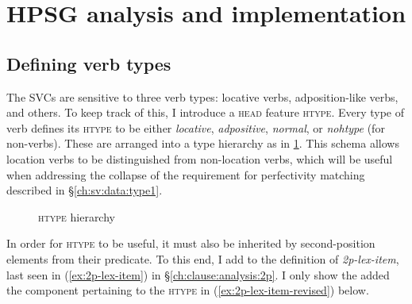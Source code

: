 \section{HPSG analysis and implementation} \label{ch:sv:analysis}

\subsection{Defining verb types} \label{ch:sv:analysis:htype}

The SVCs are sensitive to three verb types: locative verbs, adposition-like verbs, and others. To keep track of this, I introduce a \textsc{head} feature \textsc{htype}. Every type of verb defines its \textsc{htype} to be either \textit{locative}, \textit{adpositive}, \textit{normal}, or \textit{nohtype} (for non-verbs). These are arranged into a type hierarchy as in \cref{figure:htypehierarchy}. This schema allows location verbs to be distinguished from non-location verbs, which will be useful when addressing the collapse of the requirement for perfectivity matching described in \S\ref{ch:sv:data:type1}.

\begin{figure}[H]
\begin{center}
\caption{\textsc{htype} hierarchy}
\label{figure:htypehierarchy}
\end{center}
\end{figure}

In order for \textsc{htype} to be useful, it must also be inherited by second-position elements from their predicate. To this end, I add to the definition of {\textit{2p-lex-item}}, last seen in (\ref{ex:2p-lex-item}) in \S\ref{ch:clause:analysis:2p}. I only show the added the component pertaining to the \textsc{htype} in (\ref{ex:2p-lex-item-revised}) below.

